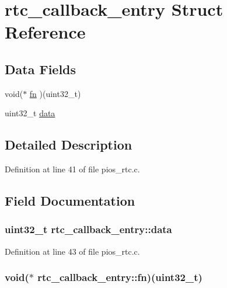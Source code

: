 \hypertarget{structrtc__callback__entry}{\section{rtc\-\_\-callback\-\_\-entry \-Struct \-Reference}
\label{structrtc__callback__entry}
}
\subsection*{\-Data \-Fields}
\begin{DoxyCompactItemize}
\item 
void($\ast$ \hyperlink{structrtc__callback__entry_a7ca379756b7000535a88945227737a87}{fn} )(uint32\-\_\-t)
\item 
uint32\-\_\-t \hyperlink{structrtc__callback__entry_ac2c725fd2cfc8a02ab9c7427f9107d5a}{data}
\end{DoxyCompactItemize}


\subsection{\-Detailed \-Description}


\-Definition at line 41 of file pios\-\_\-rtc.\-c.



\subsection{\-Field \-Documentation}
\hypertarget{structrtc__callback__entry_ac2c725fd2cfc8a02ab9c7427f9107d5a}{
\subsubsection[{data}]{\setlength{\rightskip}{0pt plus 5cm}uint32\-\_\-t {\bf rtc\-\_\-callback\-\_\-entry\-::data}}}\label{structrtc__callback__entry_ac2c725fd2cfc8a02ab9c7427f9107d5a}


\-Definition at line 43 of file pios\-\_\-rtc.\-c.

\hypertarget{structrtc__callback__entry_a7ca379756b7000535a88945227737a87}{
\subsubsection[{fn}]{\setlength{\rightskip}{0pt plus 5cm}void($\ast$ {\bf rtc\-\_\-callback\-\_\-entry\-::fn})(uint32\-\_\-t)}}\label{structrtc__callback__entry_a7ca379756b7000535a88945227737a87}



